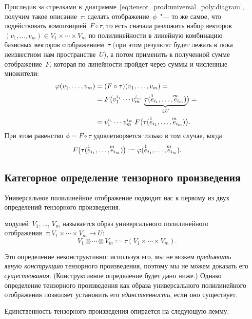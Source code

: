 Проследив за стрелками в~диаграмме~\eqref{eq:tensor_prod:universal_poly:diagram}, получим такое описание~$\tau$: сделать отображение~$\phi$~"--- то же самое, что подействовать композицией~$F \circ \tau$, то есть сначала разложить набор векторов $(v_1, \dots, v_m) \in V_1 \times \cdots \times V_m$ по полилинейности в линейную комбинацию базисных векторов отображением~$\tau$ (при этом результат будет лежать в пока неизвестном нам пространстве~$U$), а потом применить к полученной сумме отображение~$F$, которая по линейности пройдёт через суммы и численные множители:
\begin{align*}
	\phi(v_1, \dots, v_m) &=
	(F \circ \tau)(v_1, \dots, v_m)
	\nlinea{=}
	F
	\bigl(
		v_1^{i_1}
		\cdots
		v_{m}^{i_m}
		\,
		\underbrace{
			\tau(\bte{1}_{i_1}, \dots, \bte{m}_{i_m})
		}_{\in U}
	\bigr)
	\nlinea{=}
	v_1^{i_1}
	\cdots
	v_{m}^{i_m}
	\,
	F
	\bigl(
		\tau(\bte{1}_{i_1}, \dots, \bte{m}_{i_m})
	\bigr)
	.
\end{align*}
При этом равенство $\phi = F \circ \tau$ удовлетворяется только в том случае, когда
\[
	F
	\bigl(
		\tau(\bte{1}_{i_1}, \dots, \bte{m}_{i_m})
	\bigr)
	:=
	\phi(\bte{1}_{i_1}, \dots, \bte{m}_{i_m})
	.
\]

\subsection{Категорное определение тензорного произведения}

Универсальное полилинейное отображение подводит нас к первому из двух определений тензорного произведения.

\begin{definition}
	\label{def:tensor_product:im_t}
	 модулей~$V_1$, \dots, $V_m$ называется образ универсального полилинейного отображения~$\tau \colon V_1 \times \cdots \times V_m \to U$:
	\[
		V_1 \otimes \cdots \otimes V_m
		:=
		\tau(V_1 \times \cdots \times V_m)
		.
	\]
\end{definition}

Это определение неконструктивно: используя его, мы не можем \emph{предъявить явную конструкцию} тензорного произведения, поэтому мы не можем доказать его \emph{существования}. (Конструктивное определение будет дано ниже.) Однако определение тензорного произведения как образа универсального полилинейного отображения позволяет установить его \emph{единственность}, если оно существует.

Единственность тензорного произведения опирается на следующую лемму.

